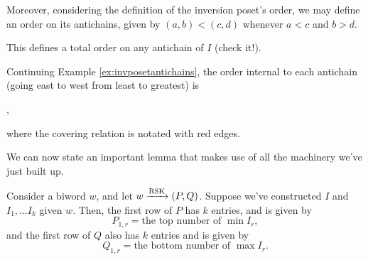\documentclass{article}
\DeclareMathOperator{\RSK}{RSK}
\newcommand{\rskarrow}{\ensuremath\xrightarrow{\RSK}}
\begin{document}
Moreover, considering the definition of the inversion poset's order, we may define an order on its antichains, given by $(a,b) < (c,d)$ whenever $a < c$ and $b > d$.

This defines a total order on any antichain of $I$ (check it!).

\begin{example}
    Continuing Example \ref{ex:invposetantichains}, the order internal to each antichain (going east to west from least to greatest) is
    \begin{center}
        ,
    \end{center}
    where the covering relation is notated with red edges.
\end{example}

We can now state an important lemma that makes use of all the machinery we've just built up.

\begin{lemma}\label{lem:invposetfirstrowrsk}
    Consider a biword $w$, and let $w \rskarrow (P, Q)$.
    Suppose we've constructed $I$ and $I_1, \ldots I_k$ given $w$.
    Then, the first row of $P$ has $k$ entries, and is given by
    \[
        P_{1,r} = \text{the top number of }\min I_r,
    \]
    and the first row of $Q$ also has $k$ entries and is given by
    \[
        Q_{1,r} = \text{the bottom number of }\max I_r.
    \]
\end{lemma}
\end{document}
